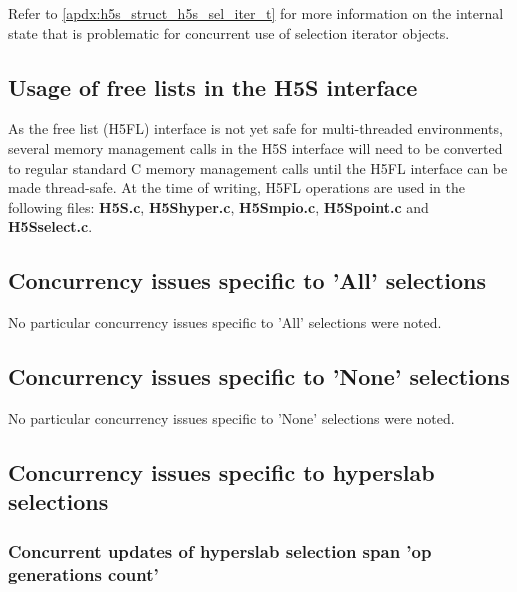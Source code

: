 \documentclass[../HDF5_RFC.tex]{subfiles}
\begin{document}
Refer to \ref{apdx:h5s_struct_h5s_sel_iter_t} for more information on the internal state
that is problematic for concurrent use of selection iterator objects.

\subsection{Usage of free lists in the H5S interface}
\label{h5s_free_lists}

As the free list (H5FL) interface is not yet safe for multi-threaded environments, several
memory management calls in the H5S interface will need to be converted to regular standard
C memory management calls until the H5FL interface can be made thread-safe. At the time of
writing, H5FL operations are used in the following files: \textbf{H5S.c}, \textbf{H5Shyper.c},
\textbf{H5Smpio.c}, \textbf{H5Spoint.c} and \textbf{H5Sselect.c}.

\subsection{Concurrency issues specific to 'All' selections}
\label{h5s_concurrency_all}

No particular concurrency issues specific to 'All' selections were noted.

\subsection{Concurrency issues specific to 'None' selections}
\label{h5s_concurrency_none}

No particular concurrency issues specific to 'None' selections were noted. 

\subsection{Concurrency issues specific to hyperslab selections}
\label{h5s_concurrency_hyper}

\subsubsection{Concurrent updates of hyperslab selection span 'op generations count'}
\label{h5s_op_gen}
\end{document}
